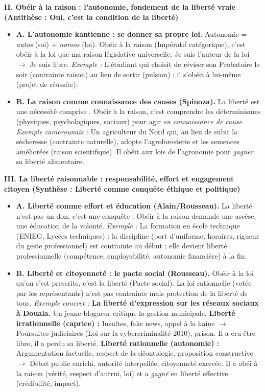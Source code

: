 \documentclass[11pt]{article}
\newcommand{\cle}[1]{{\popxbold\color{popdark}#1}}
\begin{document}
\begin{exoresolu}
\textbf{II. Obéir à la raison : l'autonomie, fondement de la liberté vraie (Antithèse : Oui, c'est la condition de la liberté)}
\begin{itemize}
    \item \textbf{A. L'autonomie kantienne : se donner sa propre loi.} \og Autonomie \fg = \emph{autos} (soi) + \emph{nomos} (loi). Obéir à la raison (\cle{Impératif catégorique}), c'est obéir à la loi que ma raison législative universelle. Je suis l'auteur de la loi $\rightarrow$ Je suis libre. \textit{Exemple :} L'étudiant qui choisit de réviser son Probatoire le soir (contrainte raison) au lieu de sortir (pulsion) : il s'obéit à lui-même (projet de réussite).
    \item \textbf{B. La raison comme connaissance des causes (Spinoza).} \og La liberté est une nécessité comprise \fg. Obéir à la raison, c'est comprendre les déterminismes (physiques, psychologiques, sociaux) pour agir \emph{en connaissance de cause}. \textit{Exemple camerounais :} Un agriculteur du Nord qui, au lieu de subir la sécheresse (contrainte naturelle), adopte l'agroforesterie et les semences améliorées (raison scientifique). Il \og obéit \fg aux lois de l'agronomie pour \emph{gagner} sa liberté alimentaire.
\end{itemize}

\textbf{III. La liberté raisonnable : responsabilité, effort et engagement citoyen (Synthèse : Liberté comme conquête éthique et politique)}
\begin{itemize}
    \item \textbf{A. Liberté comme effort et éducation (Alain/Rousseau).} \og La liberté n'est pas un don, c'est une conquête \fg. Obéir à la raison demande une \cle{ascèse}, une \cle{éducation de la volonté}. \textit{Exemple :} La formation en école technique (ENIEG, Lycées techniques) : la discipline (port d'uniforme, horaires, rigueur du geste professionnel) est contrainte au début ; elle devient liberté professionnelle (compétence, employabilité, autonomie financière) à la fin.
    \item \textbf{B. Liberté et citoyenneté : le pacte social (Rousseau).} \og Obéir à la loi qu'on s'est prescrite, c'est la liberté \fg (\cle{Pacte social}). La loi rationnelle (votée par les représentants) n'est pas contrainte mais protection de la liberté de tous. \textit{Exemple concret :} \textbf{La liberté d'expression sur les réseaux sociaux à Douala.} Un jeune blogueur critique la gestion municipale. \textbf{Liberté irrationnelle (caprice) :} Insultes, fake news, appel à la haine $\rightarrow$ Poursuites judiciaires (Loi sur la cybercriminalité 2010), prison. Il a cru être libre, il a perdu sa liberté. \textbf{Liberté rationnelle (autonomie) :} Argumentation factuelle, respect de la déontologie, proposition constructive $\rightarrow$ Débat public enrichi, autorité interpellée, citoyenneté exercée. Il a \og obéi à la raison \fg (vérité, respect d'autrui, loi) et a \emph{gagné} en liberté effective (crédibilité, impact).
\end{itemize}


\end{exoresolu}
\end{document}
